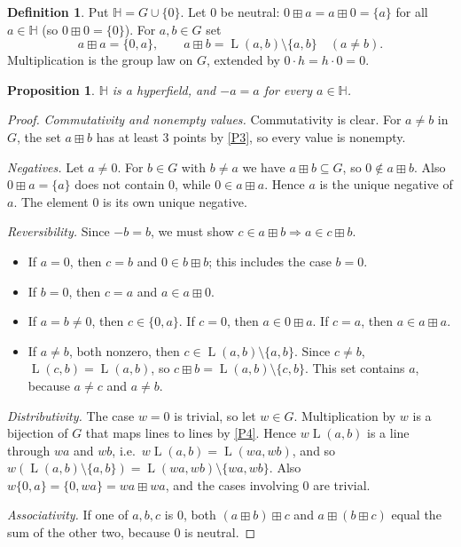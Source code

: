 \documentclass[11pt]{article}
\newtheorem{proposition}[theorem]{Proposition}
\theoremstyle{definition}
\newtheorem{definition}[theorem]{Definition}
\theoremstyle{remark}
\newcommand{\HH}{\mathbb{H}}
\newcommand{\bp}{\boxplus}
\DeclareMathOperator{\Ln}{L}
\begin{document}
\begin{definition}\label{def:H}
Put $\HH=G\cup\{0\}$. Let $0$ be neutral: $0\bp a=a\bp 0=\{a\}$ for all $a\in\HH$ (so $0\bp0=\{0\}$). For $a,b\in G$ set
\[
a\bp a=\{0,a\},\qquad a\bp b=\Ln(a,b)\setminus\{a,b\}\quad(a\neq b).
\]
Multiplication is the group law on $G$, extended by $0\cdot h=h\cdot 0=0$.
\end{definition}

\begin{proposition}\label{prop:hyperfield}
$\HH$ is a hyperfield, and $-a=a$ for every $a\in\HH$.
\end{proposition}

\begin{proof}
\emph{Commutativity and nonempty values.} Commutativity is clear. For $a\neq b$ in $G$, the set $a\bp b$ has at least $3$ points by \ref{P3}, so every value is nonempty.

\emph{Negatives.} Let $a\neq0$. For $b\in G$ with $b\neq a$ we have $a\bp b\subseteq G$, so $0\notin a\bp b$. Also $0\bp a=\{a\}$ does not contain $0$, while $0\in a\bp a$. Hence $a$ is the unique negative of $a$. The element $0$ is its own unique negative.

\emph{Reversibility.} Since $-b=b$, we must show $c\in a\bp b\Rightarrow a\in c\bp b$.
\begin{itemize}[nosep]
\item If $a=0$, then $c=b$ and $0\in b\bp b$; this includes the case $b=0$.
\item If $b=0$, then $c=a$ and $a\in a\bp 0$.
\item If $a=b\neq0$, then $c\in\{0,a\}$. If $c=0$, then $a\in 0\bp a$. If $c=a$, then $a\in a\bp a$.
\item If $a\neq b$, both nonzero, then $c\in\Ln(a,b)\setminus\{a,b\}$. Since $c\neq b$, $\Ln(c,b)=\Ln(a,b)$, so $c\bp b=\Ln(a,b)\setminus\{c,b\}$. This set contains $a$, because $a\neq c$ and $a\neq b$.
\end{itemize}

\emph{Distributivity.} The case $w=0$ is trivial, so let $w\in G$. Multiplication by $w$ is a bijection of $G$ that maps lines to lines by \ref{P4}. Hence $w\Ln(a,b)$ is a line through $wa$ and $wb$, i.e.\ $w\Ln(a,b)=\Ln(wa,wb)$, and so $w(\Ln(a,b)\setminus\{a,b\})=\Ln(wa,wb)\setminus\{wa,wb\}$. Also $w\{0,a\}=\{0,wa\}=wa\bp wa$, and the cases involving $0$ are trivial.

\emph{Associativity.} If one of $a,b,c$ is $0$, both $(a\bp b)\bp c$ and $a\bp(b\bp c)$ equal the sum of the other two, because $0$ is neutral.


\end{proof}
\end{document}
